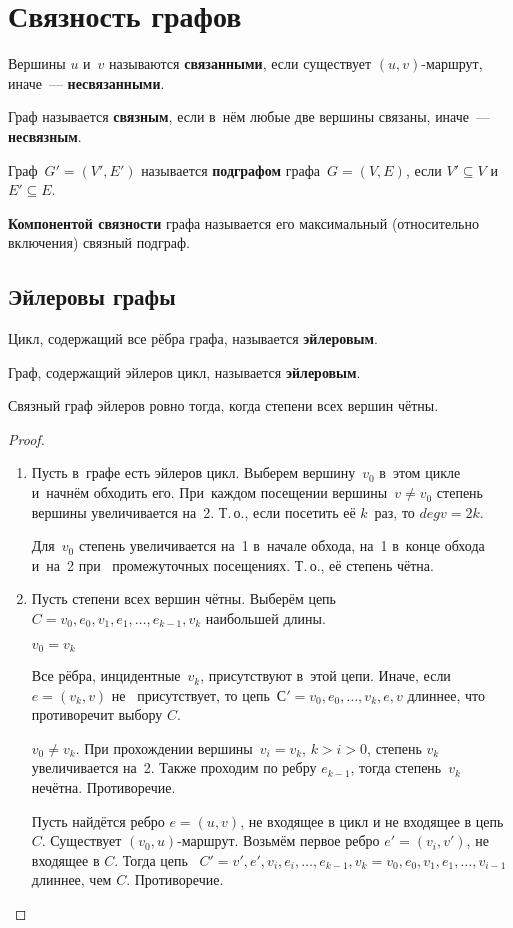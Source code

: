 \section{Связность графов}

Вершины $u$ и~$v$ называются \textbf{связанными}, если существует $(u, v)$-маршрут, иначе~---
\textbf{несвязанными}.



Граф называется \textbf{связным}, если в~нём любые две вершины связаны, иначе~--- \textbf{несвязным}.



Граф~$G' = (V', E')$ называется \textbf{подграфом} графа~$G = (V, E)$, если $V' \subseteq V$ и
~$E' \subseteq E$.



\textbf{Компонентой связности} графа называется его максимальный (относительно включения)
связный подграф.


\subsection{Эйлеровы графы}

Цикл, содержащий все рёбра графа, называется \textbf{эйлеровым}.



Граф, содержащий эйлеров цикл, называется \textbf{эйлеровым}.


\begin{theorem}
Связный граф эйлеров ровно тогда, когда степени всех вершин чётны.
\end{theorem}
\begin{proof}
\begin{enumerate}
	\item Пусть в~графе есть эйлеров цикл. Выберем вершину~$v_0$ в~этом цикле и~начнём обходить
	его. При~каждом посещении вершины~$v \neq v_0$ степень вершины увеличивается на~2. Т.\,о., если
	посетить её $k$~раз, то $deg v = 2k$.
	
	Для~$v_0$ степень увеличивается на~1 в~начале обхода, на~1 в~конце обхода и~на~2 при
	~промежуточных посещениях. Т.\,о., её степень чётна.
	
	\item Пусть степени всех вершин чётны. Выберём цепь~$C = v_0, e_0, v_1, e_1, \ldots, e_{k-1},
	v_k$ наибольшей длины.
	
	$v_0 = v_k$
	
	Все рёбра, инцидентные~$v_k$, присутствуют в~этой цепи. Иначе, если $e = (v_k, v)$ не~
	присутствует, то цепь~$С' = v_0, e_0, \ldots, v_k, e, v$ длиннее, что противоречит выбору $C$.
	
	$v_0 \neq v_k$. При прохождении вершины~$v_i = v_k$, $k > i > 0$, степень $v_k$ увеличивается на~2. Также проходим по ребру $e_{k-1}$, тогда степень~$v_k$ нечётна. Противоречие.
	
	Пусть найдётся ребро $e = (u, v)$, не входящее в цикл и не входящее в цепь~$C$. Существует $(v_0, u)$-маршрут. Возьмём первое ребро $e' = (v_i, v')$, не входящее в $C$. Тогда цепь
	~$C' = v', e', v_i, e_i, \ldots, e_{k-1}, v_k = v_0, e_0, v_1, e_1, \ldots, v_{i-1}$ длиннее,
	чем $C$. Противоречие.
\end{enumerate}
\end{proof}

